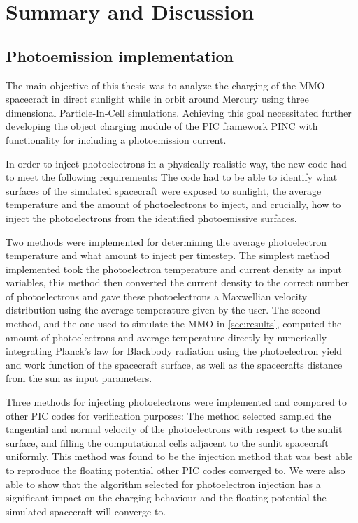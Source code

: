 \chapter{Summary and Discussion}\label{sec:conclusion}

\section{Photoemission implementation}
The main objective of this thesis was to analyze the charging of the MMO spacecraft in direct sunlight while in orbit around Mercury using three dimensional Particle-In-Cell simulations. Achieving this goal necessitated further developing the object charging module of the PIC framework PINC with functionality for including a photoemission current.

In order to inject photoelectrons in a physically realistic way, the new code had to meet the following requirements: The code had to be able to identify what surfaces of the simulated spacecraft were exposed to sunlight, the average temperature and the amount of photoelectrons to inject, and crucially, how to inject the photoelectrons from the identified photoemissive surfaces.

Two methods were implemented for determining the average photoelectron temperature and what amount to inject per timestep. The simplest method implemented took the photoelectron temperature and current density as input variables, this method then converted the current density to the correct number of photoelectrons and gave these photoelectrons a Maxwellian velocity distribution using the average temperature given by the user. The second method, and the one used to simulate the MMO in \cref{sec:results}, computed the amount of photoelectrons and average temperature directly by numerically integrating Planck's law for Blackbody radiation using the photoelectron yield and work function of the spacecraft surface, as well as the spacecrafts distance from the sun as input parameters. 

Three methods for injecting photoelectrons were implemented and compared to other PIC codes for verification purposes: The method selected sampled the tangential and normal velocity of the photoelectrons with respect to the sunlit surface, and filling the computational cells adjacent to the sunlit spacecraft uniformly. This method was found to be the injection method that was best able to reproduce the floating potential other PIC codes converged to. We were also able to show that the algorithm selected for photoelectron injection has a significant impact on the charging behaviour and the floating potential the simulated spacecraft will converge to.  


